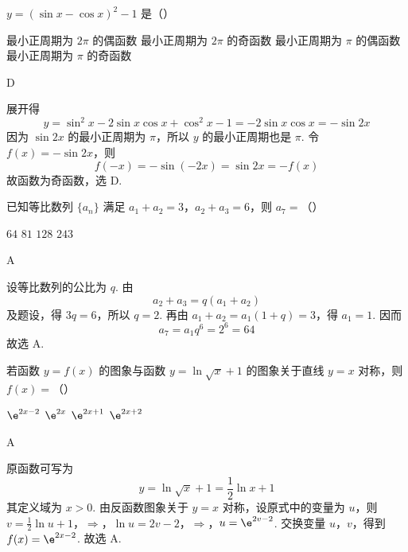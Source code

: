 \begin{problem}
\(y = (\sin x - \cos x)^{2} - 1\) 是（\quad）

\choices
    {最小正周期为 \(2\pi\) 的偶函数}
    {最小正周期为 \(2\pi\) 的奇函数}
    {最小正周期为 \(\pi\) 的偶函数}
    {最小正周期为 \(\pi\) 的奇函数}
\end{problem}

\begin{answer}
D
\end{answer}

\begin{solution}
展开得
\[
y=\sin^2x-2\sin x\cos x+\cos^2x-1=-2\sin x\cos x=-\sin2x
\]
因为 \(\sin2x\) 的最小正周期为 \(\pi\)，所以 \(y\) 的最小正周期也是 \(\pi\). 令 \(f(x)=-\sin2x\)，则
\[
f(-x)=-\sin(-2x)=\sin2x=-f(x)
\]
故函数为奇函数，选 D.
\end{solution}

\begin{problem}
已知等比数列 \(\{a_{n}\}\) 满足 \(a_{1} + a_{2} = 3\)，\(a_{2} + a_{3} = 6\)，则 \(a_{7} =\)（\quad）

\choices
    {\(64\)}
    {\(81\)}
    {\(128\)}
    {\(243\)}
\end{problem}

\begin{answer}
A
\end{answer}

\begin{solution}
设等比数列的公比为 \(q\). 由
\[
a_2+a_3=q(a_1+a_2)
\]
及题设，得 \(3q=6\)，所以 \(q=2\). 再由 \(a_1+a_2=a_1(1+q)=3\)，得 \(a_1=1\). 因而
\[
a_7=a_1q^6=2^6=64
\]
故选 A.
\end{solution}

\begin{problem}
若函数 \( y = f(x) \) 的图象与函数 \( y = \ln \sqrt{x} + 1 \) 的图象关于直线 \( y = x \) 对称，则 \( f(x) = \)（\quad）

\choices
    {\(\e^{2x - 2}\)}
    {\(\e^{2x}\)}
    {\(\e^{2x + 1}\)}
    {\(\e^{2x + 2}\)}
\end{problem}

\begin{answer}
A
\end{answer}

\begin{solution}
原函数可写为
\[
y=\ln\sqrt{x}+1=\frac12\ln x+1
\]
其定义域为 \(x>0\). 由反函数图象关于 \(y=x\) 对称，设原式中的变量为 \(u\)，则
\(v=\frac12\ln u+1\)，\(\Longrightarrow\)，\(\ln u=2v-2\)，\(\Longrightarrow\)，\(u=\e^{2v-2}\).
交换变量 \(u\)，\(v\)，得到 \(f(x)=\e^{2x-2}\). 故选 A.
\end{solution}

